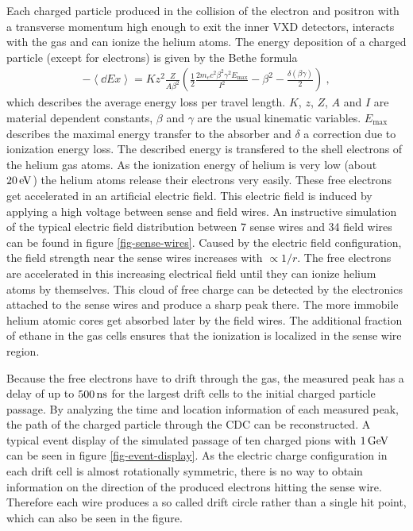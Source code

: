 Each charged particle produced in the collision of the electron and positron with a transverse momentum high enough to exit the inner VXD detectors, interacts with the gas and can ionize the helium atoms. The energy deposition of a charged particle (except for electrons) is given by the Bethe formula~\cite{bethe}
\begin{align}
 - \left\langle \dd{E}{x} \right\rangle = K z^2 \frac{Z}{A \beta^2} \left( \frac 1 2 \frac{2 m_e c^2 \beta^2 \gamma^2 E_\text{max}}{I^2} - \beta^2 - \frac{\delta(\beta \gamma)}{2}  \right) \ , \label{form-bethe}
\end{align}
which describes the average energy loss per travel length. $K$, $z$, $Z$, $A$ and $I$ are material dependent constants, $\beta$ and $\gamma$ are the usual kinematic variables. $E_\text{max}$ describes the maximal energy transfer to the absorber and $\delta$ a correction due to ionization energy loss. The described energy is transfered to the shell electrons of the helium gas atoms. As the ionization energy of helium is very low (about $\unit[20]{eV}$) the helium atoms release their electrons very easily. These free electrons get accelerated in an artificial electric field. This electric field is induced by applying a high voltage between sense and field wires. An instructive simulation of the typical electric field distribution between 7 sense wires and 34 field wires can be found in figure \ref{fig-sense-wires}. Caused by the electric field configuration, the field strength near the sense wires increases with $\propto 1/r$. The free electrons are accelerated in this increasing  electrical field until they can ionize helium atoms by themselves. This cloud of free charge can be detected by the electronics attached to the sense wires and produce a sharp peak there. The more immobile helium atomic cores get absorbed later by the field wires. The additional fraction of ethane in the gas cells ensures that the ionization is localized in the sense wire region.

Because the free electrons have to drift through the gas, the measured peak has a delay of up to $\unit[500]{ns}$ for the largest drift cells to the initial charged particle passage. By analyzing the time and location information of each measured peak, the path of the charged particle through the CDC can be reconstructed. A typical event display of the simulated passage of ten charged pions with $\unit[1]{GeV}$ can be seen in figure \ref{fig-event-display}. As the electric charge configuration in each drift cell is almost rotationally symmetric, there is no way to obtain information on the direction of the produced electrons hitting the sense wire. Therefore each wire produces a so called drift circle rather than a single hit point, which can also be seen in the figure.

